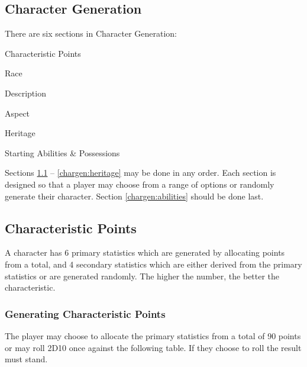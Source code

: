\begin{multicols*}{3}
\section{Character Generation}

There are six sections in Character Generation:
\begin{Description}
\item[\ref{chargen:points}] Characteristic Points
\item[\ref{chargen:race}] Race
\item[\ref{chargen:description}] Description
\item[\ref{chargen:aspect}]Aspect
\item[\ref{chargen:heritage}] Heritage
\item[\ref{chargen:abilities}] Starting Abilities \& Possessions
\end{Description}

Sections \ref{chargen:points} -- \ref{chargen:heritage} may be done
in any order. Each section is designed so that a player may choose
from a range of options or randomly generate their character. Section
\ref{chargen:abilities} should be done last.

\subsection{Characteristic Points}
\label{chargen:points}

A character has 6 primary statistics which are generated by allocating
points from a total, and 4 secondary statistics which are either
derived from the primary statistics or are generated randomly. The
higher the number, the better the characteristic.

\subsubsection{Generating Characteristic Points}

The player may choose to allocate the primary statistics from a total
of 90 points or may roll 2D10 once against the following table. If
they choose to roll the result must stand.


\end{multicols*}
